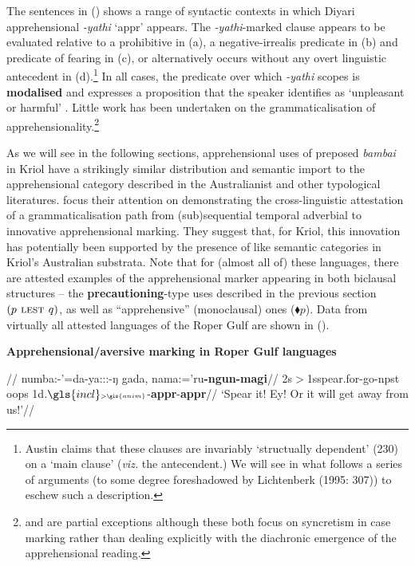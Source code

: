 The sentences in (\lastx) shows a range of syntactic contexts in which Diyari apprehensional \textit{-yathi} `{\sc appr}' appears. The \textit{-yathi}-marked clause appears to be evaluated relative to a prohibitive in (a), a negative-irrealis predicate in (b) and predicate of fearing in (c), or alternatively occurs without any overt linguistic antecedent in (d).\footnote{Austin claims that these clauses are invariably `structually dependent' (230) on a `main clause' (\textit{viz.} the antecendent.) We will see in what follows a series of arguments (to some degree foreshadowed by Lichtenberk (1995: 307)) to eschew such a description.} In all cases, the predicate over which \textit{-yathi} scopes is \textbf{modalised} and expresses a proposition that the speaker identifies as `unpleasant or harmful' \citep[227]{Austin2011}. Little work has been undertaken on the grammaticalisation of apprehensionality.\footnote{\citet[171]{Dixon2002a} and \citet[44]{Blake1993} are partial exceptions although these both focus on syncretism in case marking rather than dealing explicitly with the diachronic emergence of the apprehensional reading.}

As we will see in the following sections, apprehensional uses of preposed \textit{bambai} in Kriol have a strikingly similar distribution and semantic import to the apprehensional category described in the Australianist and other typological literatures. \citet{Angelo2016} focus their attention on demonstrating the cross-linguistic attestation of a grammaticalisation path from (sub)sequential temporal adverbial to innovative apprehensional marking. They suggest that, for Kriol, this innovation has potentially been supported by the presence of like semantic categories in Kriol's Australian substrata. Note that for (almost all of) these languages, there are attested examples of the apprehensional marker appearing in both biclausal structures -- the \textbf{precautioning}-type uses described in the previous section $ (p \textsc{ lest } q) $, as well as ``apprehensive'' (monoclausal) ones (\textit{$\blacklozenge p$}). Data from virtually all attested languages of the Roper Gulf are shown in (\nextx).

\pex \textbf{Apprehensional/aversive marking in Roper Gulf languages}



\a\begingl\glpreamble{}//
\gla numba:-'=da-ya:::-ŋ gada, nama:='ru\textbf{-ngun-magi}//
\glb 2s$\scriptscriptstyle>$1s\textdblhyphen{}spear.for-go-\gls{npst} oops 1d$.\gls{incl}\scriptscriptstyle>\gls{anim}$-\textbf{\gls{appr}}-\textbf{\gls{appr}}//
\glft`Spear it! Ey! Or it will get away from us!'//
\endgl



